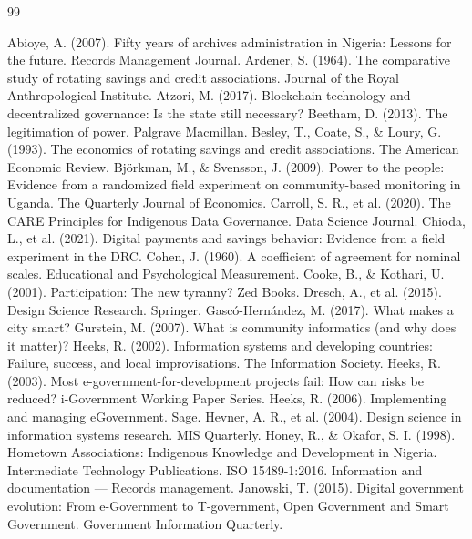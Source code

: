 \documentclass[sigconf,anonymous]{acmart}
\begin{document}
\begin{thebibliography}{99}

 Abioye, A. (2007). Fifty years of archives administration in Nigeria: Lessons for the future. Records Management Journal.
 Ardener, S. (1964). The comparative study of rotating savings and credit associations. Journal of the Royal Anthropological Institute.
 Atzori, M. (2017). Blockchain technology and decentralized governance: Is the state still necessary?
 Beetham, D. (2013). The legitimation of power. Palgrave Macmillan.
 Besley, T., Coate, S., \& Loury, G. (1993). The economics of rotating savings and credit associations. The American Economic Review.
 Björkman, M., \& Svensson, J. (2009). Power to the people: Evidence from a randomized field experiment on community-based monitoring in Uganda. The Quarterly Journal of Economics.
 Carroll, S. R., et al. (2020). The CARE Principles for Indigenous Data Governance. Data Science Journal.
 Chioda, L., et al. (2021). Digital payments and savings behavior: Evidence from a field experiment in the DRC.
 Cohen, J. (1960). A coefficient of agreement for nominal scales. Educational and Psychological Measurement.
 Cooke, B., \& Kothari, U. (2001). Participation: The new tyranny? Zed Books.
 Dresch, A., et al. (2015). Design Science Research. Springer.
 Gascó-Hernández, M. (2017). What makes a city smart?
 Gurstein, M. (2007). What is community informatics (and why does it matter)?
 Heeks, R. (2002). Information systems and developing countries: Failure, success, and local improvisations. The Information Society.
 Heeks, R. (2003). Most e-government-for-development projects fail: How can risks be reduced? i-Government Working Paper Series.
 Heeks, R. (2006). Implementing and managing eGovernment. Sage.
 Hevner, A. R., et al. (2004). Design science in information systems research. MIS Quarterly.
 Honey, R., \& Okafor, S. I. (1998). Hometown Associations: Indigenous Knowledge and Development in Nigeria. Intermediate Technology Publications.
 ISO 15489-1:2016. Information and documentation — Records management.
 Janowski, T. (2015). Digital government evolution: From e-Government to T-government, Open Government and Smart Government. Government Information Quarterly.

\end{thebibliography}
\end{document}
